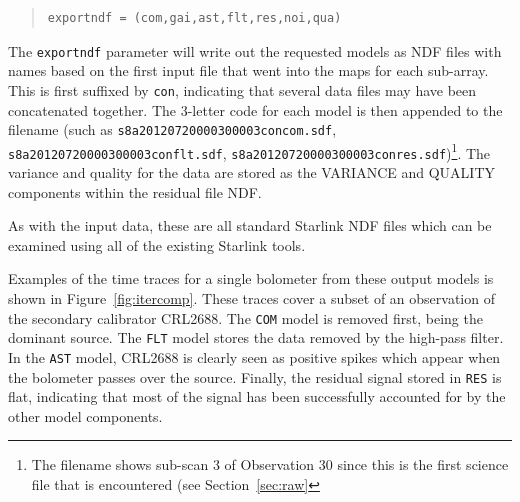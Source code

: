 \documentclass[twoside,11pt]{article}
\newcommand{\htmladdnormallink}[2]{#1}
\renewcommand{\_}{\texttt{\symbol{95}}}
\newenvironment{myquote}{\begin{quote}\begin{small}}{\end{small}\end{quote}}
\newcommand{\starlink}{\htmladdnormallink{Starlink}{http://starlink.jach.hawaii.edu}}
\begin{document}
\vspace{0cm}
\begin{myquote}
\begin{verbatim}
exportndf = (com,gai,ast,flt,res,noi,qua)
\end{verbatim}
\end{myquote}
\vspace{0cm}
The \texttt{exportndf} parameter will write out the requested models
as NDF files with names based on the first input file that went into
the maps for each sub-array. This is first suffixed by \texttt{con},
indicating that several data files may have been concatenated
together. The 3-letter code for each model is then appended to the filename (such as
\texttt{s8a20120720\_00030\_0003\_con\_com.sdf},
\linebreak
\texttt{s8a20120720\_00030\_0003\_con\_flt.sdf},
\texttt{s8a20120720\_00030\_0003\_con\_res.sdf})\footnote{The filename shows
sub-scan 3 of Observation 30 since this is the first science file that
is encountered (see Section~\ref{sec:raw}}. The variance
and quality for the data are stored as the VARIANCE and QUALITY
components within the residual file NDF.

As with the input data, these are all standard {\starlink} NDF files
which can be examined using all of the existing Starlink tools.

Examples of the time traces for a single bolometer from these output
models is shown in Figure~\ref{fig:itercomp}.  These traces cover a
subset of an observation of the secondary calibrator CRL2688. The
\texttt{COM} model is removed first, being the dominant source. The
\texttt{FLT} model stores the data removed by the high-pass filter. In
the \texttt{AST} model, CRL2688 is clearly seen as positive spikes
which appear when the bolometer passes over the source. Finally, the
residual signal stored in \texttt{RES} is flat, indicating that most
of the signal has been successfully accounted for by the other model
components.
\end{document}
